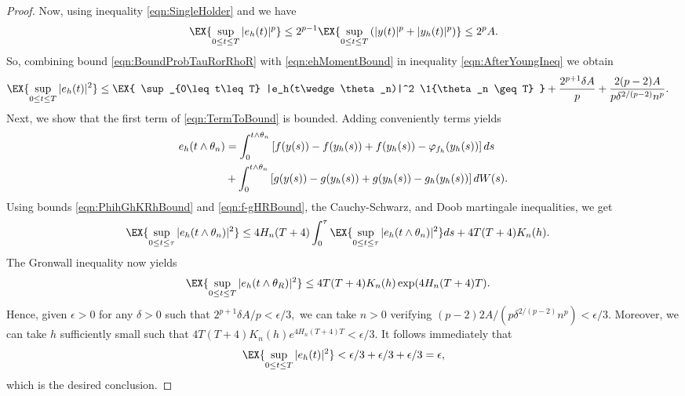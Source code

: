 \begin{proof}
	Now, using inequality \eqref{eqn:SingleHolder} and  we have
	\begin{equation} \label{eqn:ehMomentBound}
		\EX{
			\sup_{0\leq t \leq T}
			|e_h(t)|^p
		}
		\leq
		2^{p-1}
		\EX{
			\sup_{0 \leq t \leq T}
			\left(
			|y(t)|^p + |y_h(t)|^p
			\right)
		}
		\leq 2^pA.
	\end{equation}
%
	So, combining  bound \eqref{eqn:BoundProbTauRorRhoR} with \eqref{eqn:ehMomentBound}
	in inequality \eqref{eqn:AfterYoungIneq} we obtain
	\begin{align}
		\EX{
			\sup_{0\leq t \leq T}
			|e_h(t)|^2
		}
		&\leq
			\EX{
				\sup_{0\leq t\leq T}
				|e_h(t\wedge \theta_n)|^2
				\1{\theta_n \geq T}
			}
			+\frac{2^{p+1}\delta A}{p}
			+\frac{2(p-2)A}{p\delta^{2/(p-2)}n^p}. \label{eqn:TermToBound}
	\end{align}
	Next, we show that the first term of \eqref{eqn:TermToBound} is bounded. Adding conveniently terms yields
	\begin{align*}
		e_h(t\wedge\theta_n) 
			&=
			\int_{0}^{t\wedge\theta_n}
			\left[
				f(y(s)) - f(y_h(s))+f(y_h(s))
				-\varphi_{f_h}(y_h(s))
			\right]ds \notag \\
			&+
			\int_{0}^{t\wedge\theta_n}
			\left[
				g(y(s)) - g(y_h(s))+g(y_h(s))
				-g_h(y_h(s))
			\right]dW(s).
	\end{align*}
	Using bounds \eqref{eqn:PhihGhKRhBound} and \eqref{eqn:f-gHRBound}, the Cauchy-Schwarz, and
	Doob martingale inequalities, we get
	\begin{align*}
		\EX{\sup_{0\leq t \leq \tau}|e_h(t\wedge\theta_n)|^2}
		&\leq 
		4H_n(T+4)
		\int_{0}^{\tau}
			\EX{\sup_{0\leq t \leq \tau}|e_h(t\wedge\theta_n)|^2} ds 
		+
		4T(T+4)K_n(h).\notag
	\end{align*}
	The Gronwall inequality now yields
	\begin{align*}
		\EX{\sup_{0\leq t \leq T}|e_h(t\wedge\theta_R)|^2}
		&\leq
			4T(T+4)K_n(h)\exp(4H_n(T+4)T). %
	\end{align*}
	Hence, given $\epsilon>0$ for any $\delta>0$ such that
	$
		2^{p+1}\delta A/p< \epsilon/3,
	$
		we can take $n>0$ verifying
	$
		(p-2)2A/(p\delta^{2/(p-2)}n^p)<\epsilon/3.
	$
	Moreover, we can take $h$ sufficiently small such that
	$
		4T(T+4)K_n(h)e^{4H_n(T+4)T} < \epsilon/3. 
	$ 
	It follows immediately that
	$$
		\EX{\sup_{0\leq t \leq T}|e_h(t)|^2}
		<
			\epsilon/3
			+\epsilon/3
			+\epsilon/3
		=\epsilon,
	$$ which is the desired conclusion.
\end{proof}


